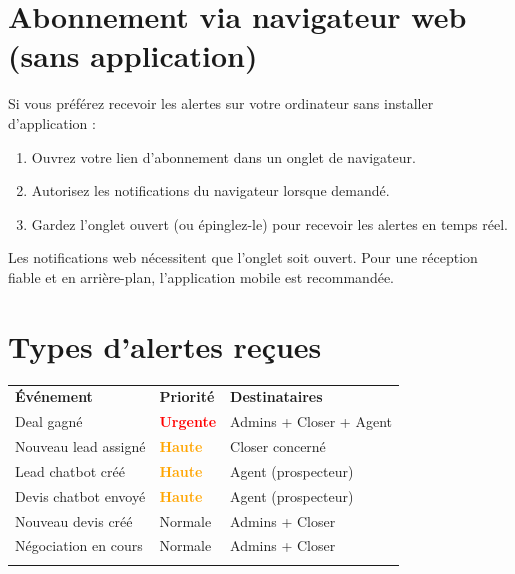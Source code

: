 \documentclass[a4paper, 11pt]{article}
\begin{document}
\section{Abonnement via navigateur web (sans application)}
\label{sec:web}

Si vous préférez recevoir les alertes sur votre ordinateur sans installer d'application :

\begin{enumerate}[leftmargin=*, label=\textbf{\arabic*.}]
  \item Ouvrez votre lien d'abonnement dans un onglet de navigateur.
  \item Autorisez les notifications du navigateur lorsque demandé.
  \item Gardez l'onglet ouvert (ou épinglez-le) pour recevoir les alertes en temps réel.
\end{enumerate}

\begin{infobox}
Les notifications web nécessitent que l'onglet soit ouvert.
Pour une réception fiable et en arrière-plan, l'application mobile est recommandée.
\end{infobox}

\section{Types d'alertes reçues}

\begin{center}
\begin{tabular}{p{4.5cm} p{3cm} p{5.5cm}}
\hline\noalign{\smallskip}
\textbf{Événement} & \textbf{Priorité} & \textbf{Destinataires} \\
\noalign{\smallskip}\hline\noalign{\smallskip}
Deal gagné & \textcolor{red}{\textbf{Urgente}} & Admins + Closer + Agent \\
Nouveau lead assigné & \textcolor{orange}{\textbf{Haute}} & Closer concerné \\
Lead chatbot créé & \textcolor{orange}{\textbf{Haute}} & Agent (prospecteur) \\
Devis chatbot envoyé & \textcolor{orange}{\textbf{Haute}} & Agent (prospecteur) \\
Nouveau devis créé & Normale & Admins + Closer \\
Négociation en cours & Normale & Admins + Closer \\
\noalign{\smallskip}\hline
\end{tabular}
\end{center}
\end{document}
